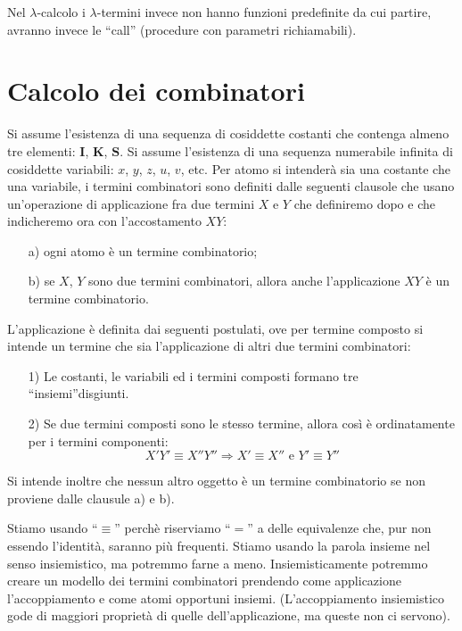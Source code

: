 \documentclass{book}
\begin{document}
Nel $\lambda$-calcolo i $\lambda$-termini invece non hanno funzioni predefinite
 da cui partire, avranno invece le ``call'' (procedure con parametri
richiamabili).


\section{Calcolo dei combinatori}

Si assume l'esistenza di una sequenza di cosiddette costanti che contenga
almeno tre elementi: $\mathbf{I}$, $\mathbf{K}$, $\mathbf{S}$.
Si assume l'esistenza di una sequenza numerabile infinita di cosiddette
variabili: $x$, $y$, $z$, $u$, $v$, etc.
Per atomo si intender\`a sia una costante che una variabile, i termini
combinatori sono definiti dalle seguenti clausole che usano un'operazione di
applicazione fra due termini $X$ e $Y$ che definiremo dopo e che indicheremo
ora con l'accostamento $ XY $:

\begin{enumerate}
\item[a)]ogni atomo \`e un termine combinatorio;
\item[b)]se $X$, $Y$ sono due termini combinatori, allora anche l'applicazione
$XY$ \`e un termine combinatorio.
\end{enumerate}

L'applicazione \`e definita dai seguenti postulati, ove per termine composto
si intende un termine che sia l'applicazione di altri due termini combinatori:
\begin{enumerate}
\item[1)]Le costanti, le variabili ed i termini composti formano tre 
``insiemi''disgiunti.
\item[2)]Se due termini composti sono le stesso termine, allora cos\`i \`e
ordinatamente per i termini componenti:
\begin{equation}
X' Y' \equiv  X'' Y'' \Longrightarrow X' \equiv X''  \text{ e } Y' \equiv Y''
\end{equation}
\end{enumerate}

Si intende inoltre che nessun altro oggetto \`e un termine combinatorio se
non proviene dalle clausule a) e b).

Stiamo usando ``$\equiv$''  perch\`e riserviamo ``$=$'' a delle equivalenze 
che, pur non essendo l'identit\`a, saranno pi\`u frequenti. Stiamo usando la 
parola insieme nel senso insiemistico, ma potremmo farne a meno.
Insiemisticamente potremmo creare un modello dei termini combinatori prendendo
come applicazione l'accoppiamento e come atomi opportuni insiemi.
(L'accoppiamento insiemistico gode di maggiori propriet\`a di quelle
dell'applicazione, ma queste non ci servono).
\end{document}
